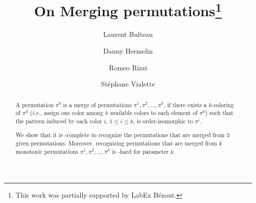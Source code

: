 \documentclass[a4paper,UKenglish,cleveref,autoref,thm-restate]{lipics-v2021}
\title{On Merging permutations\footnote{This work was partially supported by LabEx Bézout.}}
\author{Laurent Bulteau}{LIGM, Univ Gustave Eiffel, CNRS, 77454 Marne-la-Vallée, France}{laurent.bulteau@univ-eiffel.fr}{}{}
\author{Danny Hermelin}{Ben-Gurion University of the Negev, Israel}{hermelin@bgu.ac.il}{}{}
\author{Romeo Rizzi}{Computer Science Department, University of Verona, Verona, Italy}{romeo.rizzi@univr.it}{}{}
\author{Stéphane Vialette}{LIGM, Univ Gustave Eiffel, CNRS, 77454 Marne-la-Vallée, France}{stephane.vialette@univ-eiffel.fr}{}{}
\begin{document}

\maketitle

\begin{abstract}
  A permutation $\pi^0$ is a merge of permutations 
  $\pi^1, \pi^2, \dots, \pi^k$, 
  if there exists a $k$-coloring of $\pi^0$ (\emph{i.e.}, assign one color
  among $k$ available colors to each element of $\pi^0$) such that the
  pattern induced by each color $i$, $1 \leq i \leq k$, is order-isomorphic
  to $\pi^i$.

  We show that it is \NP-complete to recognize the permutations that are merged
  from $3$ given permutations.
  Moreover, recognizing permutations that are merged from $k$ monotonic permutations 
  $\pi^1, \pi^2, \dots, \pi^k$ is \W[1]-hard for parameter $k$.
\end{abstract}







%

%






%


\end{document}

